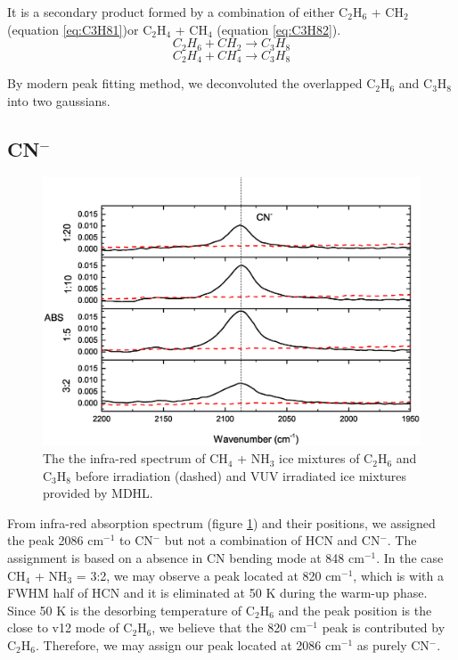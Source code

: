 It is a secondary product formed by a combination of either C$_2$H$_6$ + CH$_2$ (equation \ref{eq:C3H81})or C$_2$H$_4$ + CH$_4$ (equation \ref{eq:C3H82}).
\begin{equation}
C_2H_6 + CH_2 \rightarrow C_3H_8
\label{eq:C3H81}
\end{equation}
\begin{equation}
C_2H_4 + CH_4 \rightarrow C_3H_8
\label{eq:C3H82}
\end{equation}

By modern peak fitting method, we deconvoluted the overlapped C$_2$H$_6$ and C$_3$H$_8$ into two gaussians.

\subsection{CN$^-$}

\begin{figure}
\centering
\includegraphics[width=\textwidth]{figures/chapter3/CN.eps}
\caption{The the infra-red spectrum of CH$_4$ + NH$_3$ ice mixtures of C$_2$H$_6$ and C$_3$H$_8$ before irradiation (dashed) and VUV irradiated ice mixtures provided by MDHL. }
\label{fig:CN}
\end{figure}

From infra-red absorption spectrum (figure \ref{fig:CN}) and their positions, we assigned the peak 2086 cm$^{-1}$ to CN$^-$  but not a combination of HCN and CN$^-$. The assignment is based on a absence in CN bending mode at 848 cm$^{-1}$. In the case CH$_4$ + NH$_3$ = 3:2, we may observe a peak located at 820 cm$^{-1}$, which is with a FWHM half of HCN and it is eliminated at 50 K during the warm-up phase. Since 50 K is the desorbing temperature of C$_2$H$_6$ and the peak position is the close to v12 mode of C$_2$H$_6$, we believe that the 820 cm$^{-1}$ peak is contributed by C$_2$H$_6$. Therefore, we may assign our peak located at 2086 cm$^{-1}$ as purely CN$^-$.\\

